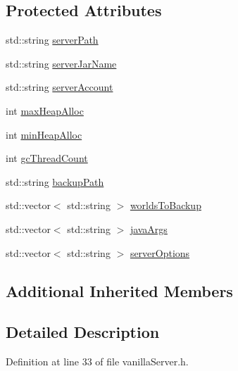 \subsection*{Protected Attributes}
\begin{DoxyCompactItemize}
\item 
std\+::string \hyperlink{class_minecraft_server_service_1_1_vanilla_server_a5a706e3f6d83ef1eb38ab2c8e2998955}{server\+Path}
\item 
std\+::string \hyperlink{class_minecraft_server_service_1_1_vanilla_server_aa52c191c12cdc8ed91dfbddf40331b62}{server\+Jar\+Name}
\item 
std\+::string \hyperlink{class_minecraft_server_service_1_1_vanilla_server_a725f891aea7180f391ba188c67dbdeab}{server\+Account}
\item 
int \hyperlink{class_minecraft_server_service_1_1_vanilla_server_ac065cff3dfe1b639259feee3a9f6767c}{max\+Heap\+Alloc}
\item 
int \hyperlink{class_minecraft_server_service_1_1_vanilla_server_a5e1519f9ec36c337ea713b4502e37f3f}{min\+Heap\+Alloc}
\item 
int \hyperlink{class_minecraft_server_service_1_1_vanilla_server_ad1097ba0b31d2f9f48fdbaf095b0e473}{gc\+Thread\+Count}
\item 
std\+::string \hyperlink{class_minecraft_server_service_1_1_vanilla_server_a3e69116180a7fc5acd2a0b934a46c312}{backup\+Path}
\item 
std\+::vector$<$ std\+::string $>$ \hyperlink{class_minecraft_server_service_1_1_vanilla_server_aec51859d7b2d8699ea1bba8811092414}{worlds\+To\+Backup}
\item 
std\+::vector$<$ std\+::string $>$ \hyperlink{class_minecraft_server_service_1_1_vanilla_server_a5505cb132333925275cafd3d0ef96fd8}{java\+Args}
\item 
std\+::vector$<$ std\+::string $>$ \hyperlink{class_minecraft_server_service_1_1_vanilla_server_a374f28043dec2295f0b84267fd181bfc}{server\+Options}
\end{DoxyCompactItemize}
\subsection*{Additional Inherited Members}


\subsection{Detailed Description}


Definition at line 33 of file vanilla\+Server.\+h.



